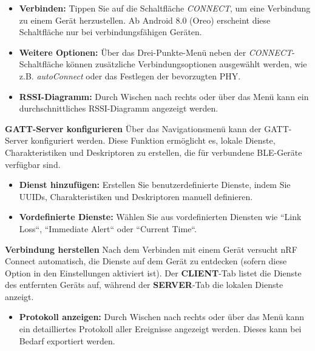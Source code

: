 \begin{itemize}
    \item \textbf{Verbinden:} Tippen Sie auf die Schaltfläche \textit{CONNECT}, um eine Verbindung zu einem Gerät herzustellen. Ab Android 8.0 (Oreo) erscheint diese Schaltfläche nur bei verbindungsfähigen Geräten.
    
    \item \textbf{Weitere Optionen:} Über das Drei-Punkte-Menü neben der \textit{CONNECT}-Schaltfläche können zusätzliche Verbindungsoptionen ausgewählt werden, wie z.B. \textit{autoConnect} oder das Festlegen der bevorzugten PHY.
    
    \item \textbf{RSSI-Diagramm:} Durch Wischen nach rechts oder über das Menü kann ein durchschnittliches RSSI-Diagramm angezeigt werden.
\end{itemize}

\vspace{1\baselineskip}

\textbf{GATT-Server konfigurieren}
Über das Navigationsmenü kann der GATT-Server konfiguriert werden. Diese Funktion ermöglicht es, lokale Dienste, Charakteristiken und Deskriptoren zu erstellen, die für verbundene BLE-Geräte verfügbar sind.
\cite{Philips:Mobile:Android}

\begin{itemize}
    \item \textbf{Dienst hinzufügen:} Erstellen Sie benutzerdefinierte Dienste, indem Sie UUIDs, Charakteristiken und Deskriptoren manuell definieren.
    
    \item \textbf{Vordefinierte Dienste:} Wählen Sie aus vordefinierten Diensten wie ``Link Loss``, ``Immediate Alert`` oder ``Current Time``.
\end{itemize}

\vspace{1\baselineskip}

\textbf{Verbindung herstellen}
Nach dem Verbinden mit einem Gerät versucht nRF Connect automatisch, die Dienste auf dem Gerät zu entdecken (sofern diese Option in den Einstellungen aktiviert ist). Der \textbf{CLIENT}-Tab listet die Dienste des entfernten Geräts auf, während der \textbf{SERVER}-Tab die lokalen Dienste anzeigt.
\cite{Philips:Mobile:Android}

\begin{itemize}
    \item \textbf{Protokoll anzeigen:} Durch Wischen nach rechts oder über das Menü kann ein detailliertes Protokoll aller Ereignisse angezeigt werden. Dieses kann bei Bedarf exportiert werden.
\end{itemize}


